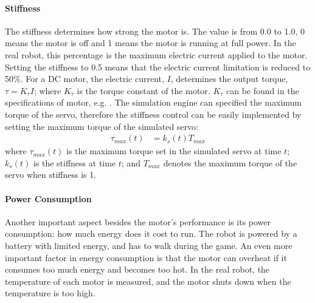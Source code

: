 \documentclass{llncs}
\begin{document}
\paragraph{Stiffness}
The stiffness determines how strong the motor is. The value is from 0.0
to 1.0, 0 means the motor is off and 1 means the motor is running at
full power. In the real robot,
this percentage is the maximum electric current applied to the motor. Setting the
stiffness to 0.5 means that the electric current limitation is reduced
to 50\%.
For a DC motor, the electric current, $I$, determines the output torque,
$\tau = K_\tau I \label{eq:tau-i}$;
where $K_\tau$ is the torque constant of the motor. $K_\tau$ can be found in the
specifications of motor, e.g. \cite{naoqi}.
The simulation engine can specified the maximum torque of the servo, therefore the
stiffness control can be easily implemented by setting the maximum torque
of the simulated servo:
\begin{align}
  \tau_{max}(t) &= k_{s}(t) T_{max}
\end{align}
where $\tau_{max}(t)$ is the maximum torque set in the simulated servo at
time $t$; $k_{s}(t)$ is the stiffness at time $t$; and $T_{max}$
denotes the maximum torque of the servo when stiffness is 1.

\paragraph{Power Consumption}
Another important aspect besides the motor's performance is its
power consumption: how much energy does it cost to run.
The robot is powered by a battery with limited energy, and has to walk during the
game.
An even more important factor in energy consumption is
that the motor can overheat if it consumes too much energy and
becomes too hot.
In the real robot, the temperature of each motor is measured, and the motor shuts down 
when the temperature is too high.
\end{document}
